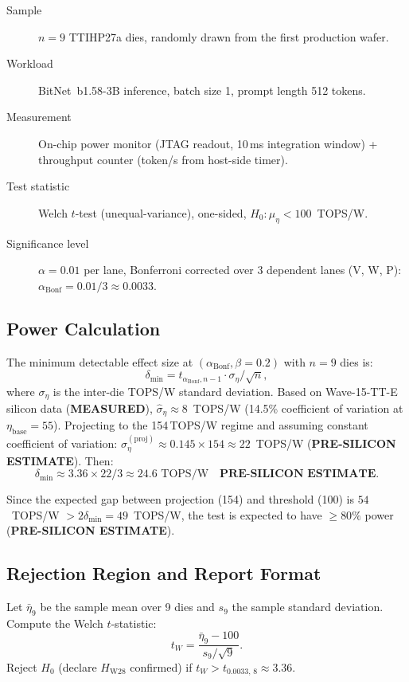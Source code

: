 \begin{description}
  \item[Sample] \(n = 9\) TTIHP27a dies, randomly drawn from the first
    production wafer.
  \item[Workload] BitNet~b1.58-3B \cite{bitnet_b158_2024} inference,
    batch size 1, prompt length 512 tokens.
  \item[Measurement] On-chip power monitor (JTAG readout, 10\,ms integration
    window) + throughput counter (token/s from host-side timer).
  \item[Test statistic] Welch \(t\)-test (unequal-variance), one-sided,
    \(H_{0}: \mu_{\eta} < 100\)~TOPS/W.
  \item[Significance level] \(\alpha = 0.01\) per lane, Bonferroni corrected
    over 3 dependent lanes (V, W, P):
    \(\alpha_{\mathrm{Bonf}} = 0.01/3 \approx 0.0033\).
\end{description}

\subsection{Power Calculation}

The minimum detectable effect size at \((\alpha_{\mathrm{Bonf}}, \beta = 0.2)\)
with \(n = 9\) dies is:
\[
  \delta_{\min} = t_{\alpha_{\mathrm{Bonf}}, n-1} \cdot \sigma_{\eta} / \sqrt{n},
\]
where \(\sigma_{\eta}\) is the inter-die TOPS/W standard deviation.
Based on Wave-15-TT-E silicon data (\textbf{MEASURED}),
\(\hat{\sigma}_{\eta} \approx 8\)~TOPS/W (14.5\% coefficient of variation
at \(\eta_{\mathrm{base}} = 55\)).  Projecting to the 154\,TOPS/W regime
and assuming constant coefficient of variation:
\(\sigma_{\eta}^{(\mathrm{proj})} \approx 0.145 \times 154 \approx 22\)~TOPS/W
(\textbf{PRE-SILICON ESTIMATE}).  Then:
\[
  \delta_{\min}
  \approx 3.36 \times 22 / 3 \approx 24.6\text{ TOPS/W}
  \quad \textbf{PRE-SILICON ESTIMATE}.
\]

Since the expected gap between projection (154) and threshold (100) is
\(54\)~TOPS/W \(> 2\delta_{\min} = 49\)~TOPS/W, the test is expected to have
\(\geq 80\%\) power (\textbf{PRE-SILICON ESTIMATE}).

\subsection{Rejection Region and Report Format}

Let \(\bar{\eta}_{9}\) be the sample mean over 9 dies and \(s_{9}\) the
sample standard deviation.  Compute the Welch \(t\)-statistic:
\[
  t_{W} = \frac{\bar{\eta}_{9} - 100}{s_{9}/\sqrt{9}}.
\]
Reject \(H_{0}\) (declare \(H_{\mathrm{W28}}\) confirmed) if
\(t_{W} > t_{0.0033,\, 8} \approx 3.36\).

